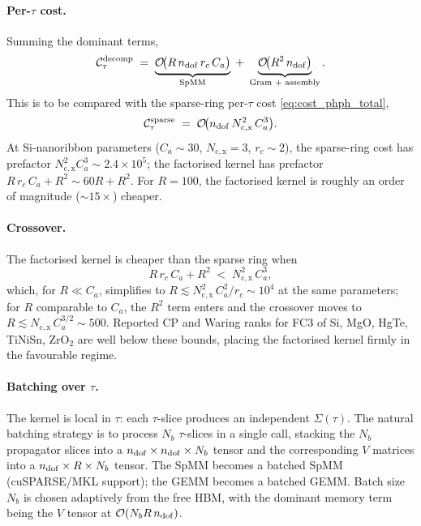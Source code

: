 \paragraph{Per-$\tau$ cost.}
Summing the dominant terms,
\begin{equation}\label{eq:per_tau_cost}
  \mathcal{C}_{\tau}^{\mathrm{decomp}}
  \;=\;
  \underbrace{\mathcal{O}\!\bigl(R\,n_{\mathrm{dof}}\,r_c\,C_a\bigr)}_{\text{SpMM}}
  \;+\;
  \underbrace{\mathcal{O}\!\bigl(R^{2}\,n_{\mathrm{dof}}\bigr)}_{\text{Gram + assembly}}.
\end{equation}
This is to be compared with the sparse-ring per-$\tau$ cost
\cref{eq:cost_phph_total},
\begin{equation}\label{eq:per_tau_cost_sparse}
  \mathcal{C}_{\tau}^{\mathrm{sparse}}
  \;=\;
  \mathcal{O}\!\bigl(n_{\mathrm{dof}}\,N_\mathrm{c,x}^{2}\,C_a^{3}\bigr).
\end{equation}
At Si-nanoribbon parameters ($C_a\sim 30$, $N_\mathrm{c,x}=3$,
$r_c\sim 2$), the sparse-ring cost has prefactor
$N_\mathrm{c,x}^{2}C_a^{3}\sim 2.4\times 10^{5}$; the factorised
kernel has prefactor $R\,r_c\,C_a + R^{2}\sim 60R + R^{2}$. For
$R=100$, the factorised kernel is roughly an order of magnitude
($\sim 15\times$) cheaper.

\paragraph{Crossover.}
The factorised kernel is cheaper than the sparse ring when
\begin{equation}\label{eq:crossover}
  R\,r_c\,C_a + R^{2}
  \;<\; N_\mathrm{c,x}^{2}\,C_a^{3},
\end{equation}
which, for $R\ll C_a$, simplifies to $R\lesssim N_\mathrm{c,x}^{2}\,C_a^{2}/r_c\sim 10^{4}$
at the same parameters; for $R$ comparable to $C_a$, the $R^{2}$
term enters and the crossover moves to
$R\lesssim N_\mathrm{c,x}\,C_a^{3/2}\sim 500$. Reported CP and
Waring ranks for FC3 of Si, MgO, HgTe, TiNiSn, ZrO$_2$
\cite{luo_tensor_2025} are well below these bounds, placing the
factorised kernel firmly in the favourable regime.

\paragraph{Batching over $\tau$.}
The kernel is local in $\tau$: each $\tau$-slice produces an
independent $\Sigma(\tau)$. The natural batching strategy is to
process $N_b$ $\tau$-slices in a single call, stacking the
$N_b$ propagator slices into a $n_{\mathrm{dof}}\times n_{\mathrm{dof}}\times N_b$ tensor
and the corresponding $V$ matrices into a $n_{\mathrm{dof}}\times R\times N_b$
tensor. The SpMM becomes a batched SpMM (cuSPARSE/MKL support);
the GEMM becomes a batched GEMM. Batch size $N_b$ is chosen
adaptively from the free HBM, with the dominant memory term being
the $V$ tensor at $\mathcal{O}(N_b R\,n_{\mathrm{dof}})$.

